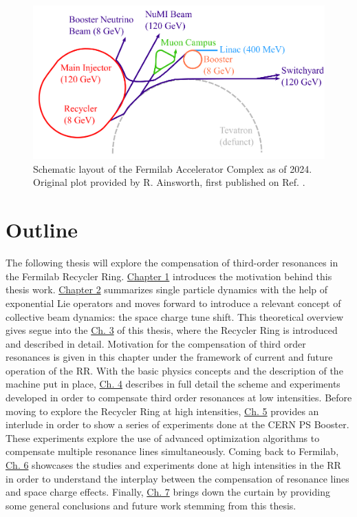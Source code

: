 \begin{figure}[H]
    \centering
    \includegraphics[width=\columnwidth]{chapter1/complex.png}
    \caption{Schematic layout of the Fermilab Accelerator Complex as of 2024. Original plot provided by R. Ainsworth, first published on Ref. \cite{rr1}.}
    \label{fig:fac}
 \end{figure}

\section{Outline}

The following thesis will explore the compensation of third-order resonances in the Fermilab Recycler Ring. \hyperref[sec:ch1]{Chapter 1} introduces the motivation behind this thesis work. \hyperref[sec:ch2]{Chapter 2} summarizes single particle dynamics with the help of exponential Lie operators and moves forward to introduce a relevant concept of collective beam dynamics: the space charge tune shift. This theoretical overview gives segue into the \hyperref[sec:ch3]{Ch. 3} of this thesis, where the Recycler Ring is introduced and described in detail. Motivation for the compensation of third order resonances is given in this chapter under the framework of current and future operation of the RR. With the basic physics concepts and the description of the machine put in place, \hyperref[sec:ch4]{Ch. 4} describes in full detail the scheme and experiments developed in order to compensate third order resonances at low intensities. Before moving to explore the Recycler Ring at high intensities, \hyperref[sec:ch5]{Ch. 5} provides an interlude in order to show a series of experiments done at the CERN PS Booster. These experiments explore the use of advanced optimization algorithms to compensate multiple resonance lines simultaneously. Coming back to Fermilab, \hyperref[sec:ch6]{Ch. 6} showcases the studies and experiments done at high intensities in the RR in order to understand the interplay between the compensation of resonance lines and space charge effects. Finally, \hyperref[sec:ch7]{Ch. 7} brings down the curtain by providing some general conclusions and future work stemming from this thesis.
